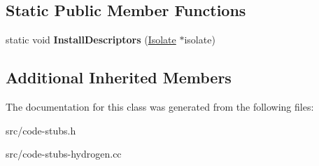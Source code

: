 \subsection*{Static Public Member Functions}
\begin{DoxyCompactItemize}
\item 
\hypertarget{classv8_1_1internal_1_1_to_number_stub_a588fcd10f590a83054f7beabb2ae618f}{}static void {\bfseries Install\+Descriptors} (\hyperlink{classv8_1_1internal_1_1_isolate}{Isolate} $\ast$isolate)\label{classv8_1_1internal_1_1_to_number_stub_a588fcd10f590a83054f7beabb2ae618f}

\end{DoxyCompactItemize}
\subsection*{Additional Inherited Members}


The documentation for this class was generated from the following files\+:\begin{DoxyCompactItemize}
\item 
src/code-\/stubs.\+h\item 
src/code-\/stubs-\/hydrogen.\+cc\end{DoxyCompactItemize}
